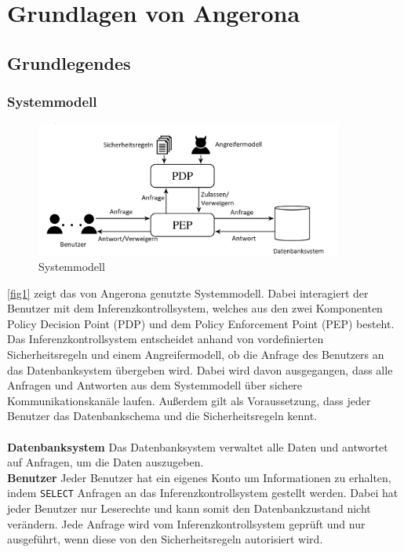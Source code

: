 \documentclass[german,version-2020-11]{uzl-thesis}
\begin{document}
\chapter{Grundlagen von Angerona}\label{chap:Grundlagen}
\section{Grundlegendes}
\subsection{Systemmodell}
\begin{figure}[ht]
	\centering
	\includegraphics[width=0.9\textwidth]{System-model.PNG}
	\caption{Systemmodell}
	\label{fig1}
\end{figure}
\noindent 
\autoref{fig1} zeigt das von Angerona genutzte Systemmodell. Dabei interagiert der Benutzer mit dem Inferenzkontrollsystem, welches aus den zwei Komponenten Policy Decision Point (PDP) und dem Policy Enforcement Point (PEP) besteht. Das Inferenzkontrollsystem entscheidet anhand von vordefinierten Sicherheitsregeln und einem Angreifermodell, ob die Anfrage des Benutzers an das Datenbanksystem übergeben wird. Dabei wird davon ausgegangen, dass alle Anfragen und Antworten aus dem Systemmodell über sichere Kommunikationskanäle laufen. Außerdem gilt als Voraussetzung, dass jeder Benutzer das Datenbankschema und die Sicherheitsregeln kennt. \\ \\ 
\textbf{Datenbanksystem} Das Datenbanksystem verwaltet alle Daten und antwortet auf Anfragen, um die Daten auszugeben. \\
\textbf{Benutzer} Jeder Benutzer hat ein eigenes Konto um Informationen zu erhalten, indem \texttt{SELECT} Anfragen an das Inferenzkontrollsystem gestellt werden. Dabei hat jeder Benutzer nur Leserechte und kann somit den Datenbankzustand nicht verändern. Jede Anfrage wird vom Inferenzkontrollsystem geprüft und nur ausgeführt, wenn diese von den Sicherheitsregeln autorisiert wird. \\ 
\end{document}
